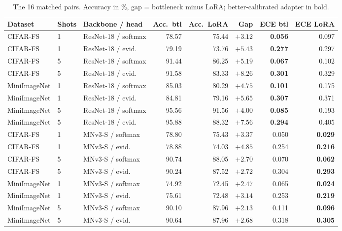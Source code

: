 \begin{table}[H]
\centering
\caption{The 16 matched pairs. Accuracy in \%, gap = bottleneck minus LoRA; better-calibrated adapter in bold.}
\label{tab:pairs}
\small
\begin{adjustbox}{max width=\textwidth}
\begin{tabular}{@{}lllrrrrr@{}}
\toprule
Dataset & Shots & Backbone / head & Acc.\ btl & Acc.\ LoRA & Gap & ECE btl & ECE LoRA \\
\midrule
CIFAR-FS & 1 & ResNet-18 / softmax & 78.57 & 75.44 & $+3.12$ & \textbf{0.056} & 0.097 \\
CIFAR-FS & 1 & ResNet-18 / evid. & 79.19 & 73.76 & $+5.43$ & \textbf{0.277} & 0.297 \\
CIFAR-FS & 5 & ResNet-18 / softmax & 91.44 & 86.25 & $+5.19$ & \textbf{0.067} & 0.102 \\
CIFAR-FS & 5 & ResNet-18 / evid. & 91.58 & 83.33 & $+8.26$ & \textbf{0.301} & 0.329 \\
MiniImageNet & 1 & ResNet-18 / softmax & 85.03 & 80.29 & $+4.75$ & \textbf{0.101} & 0.175 \\
MiniImageNet & 1 & ResNet-18 / evid. & 84.81 & 79.16 & $+5.65$ & \textbf{0.307} & 0.371 \\
MiniImageNet & 5 & ResNet-18 / softmax & 95.56 & 91.56 & $+4.00$ & \textbf{0.085} & 0.193 \\
MiniImageNet & 5 & ResNet-18 / evid. & 95.88 & 88.32 & $+7.56$ & \textbf{0.294} & 0.405 \\
\midrule
CIFAR-FS & 1 & MNv3-S / softmax & 78.80 & 75.43 & $+3.37$ & 0.050 & \textbf{0.029} \\
CIFAR-FS & 1 & MNv3-S / evid. & 78.88 & 74.03 & $+4.85$ & 0.254 & \textbf{0.216} \\
CIFAR-FS & 5 & MNv3-S / softmax & 90.74 & 88.05 & $+2.70$ & 0.070 & \textbf{0.062} \\
CIFAR-FS & 5 & MNv3-S / evid. & 90.24 & 87.52 & $+2.72$ & 0.304 & \textbf{0.293} \\
MiniImageNet & 1 & MNv3-S / softmax & 74.92 & 72.45 & $+2.47$ & 0.065 & \textbf{0.024} \\
MiniImageNet & 1 & MNv3-S / evid. & 75.61 & 72.48 & $+3.14$ & 0.253 & \textbf{0.219} \\
MiniImageNet & 5 & MNv3-S / softmax & 90.10 & 87.96 & $+2.13$ & 0.111 & \textbf{0.096} \\
MiniImageNet & 5 & MNv3-S / evid. & 90.64 & 87.96 & $+2.68$ & 0.318 & \textbf{0.305} \\
\bottomrule
\end{tabular}
\end{adjustbox}
\end{table}


